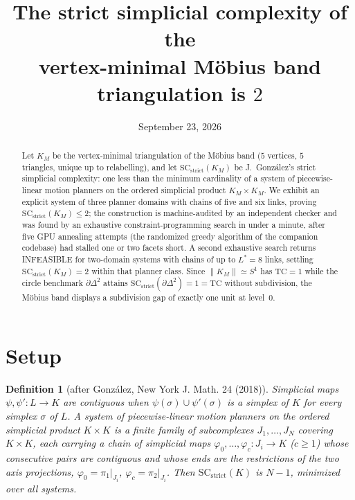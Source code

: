 \documentclass[11pt]{article}
\title{The strict simplicial complexity of the\\
vertex-minimal M\"obius band triangulation is $2$}
\date{September 23, 2026}
\newtheorem{definition}[theorem]{Definition}
\theoremstyle{remark}
\begin{document}
\maketitle

\begin{abstract}
Let $K_M$ be the vertex-minimal triangulation of the M\"obius band ($5$
vertices, $5$ triangles, unique up to relabelling), and let
$\mathrm{SC}_{\mathrm{strict}}(K_M)$ be J.\ Gonz\'alez's strict simplicial
complexity: one less than the minimum cardinality of a system of
piecewise-linear motion planners on the ordered simplicial product
$K_M\times K_M$.  We exhibit an explicit system of three planner domains
with chains of five and six links, proving
$\mathrm{SC}_{\mathrm{strict}}(K_M)\le2$; the construction is machine-audited
by an independent checker and was found by an exhaustive
constraint-programming search in under a minute, after five GPU annealing
attempts (the randomized greedy algorithm of the companion codebase) had
stalled one or two facets short.  A second exhaustive search returns
INFEASIBLE for two-domain systems with chains of up to $L^\ast=8$ links,
settling $\mathrm{SC}_{\mathrm{strict}}(K_M)=2$ within that planner class.
Since $\|K_M\|\simeq S^1$ has $\mathrm{TC}=1$ while the circle benchmark
$\partial\Delta^2$ attains
$\mathrm{SC}_{\mathrm{strict}}(\partial\Delta^2)=1=\mathrm{TC}$ without
subdivision, the M\"obius band displays a subdivision gap of exactly one
unit at level~$0$.
\end{abstract}

\section{Setup}

\begin{definition}[after Gonz\'alez, New York J. Math. 24 (2018)]
\label{def:sc}
Simplicial maps $\psi,\psi'\colon L\to K$ are \emph{contiguous} when
$\psi(\sigma)\cup\psi'(\sigma)$ is a simplex of $K$ for every simplex
$\sigma$ of $L$.  A \emph{system of piecewise-linear motion planners} on
the ordered simplicial product $K\times K$ is a finite family of
subcomplexes $J_1,\dots,J_N$ covering $K\times K$, each carrying a chain
of simplicial maps $\varphi_0,\dots,\varphi_c\colon J_i\to K$ ($c\ge1$)
whose consecutive pairs are contiguous and whose ends are the restrictions
of the two axis projections, $\varphi_0=\pi_1|_{J_i}$,
$\varphi_c=\pi_2|_{J_i}$.  Then $\mathrm{SC}_{\mathrm{strict}}(K)$ is
$N-1$, minimized over all systems.
\end{definition}
\end{document}
